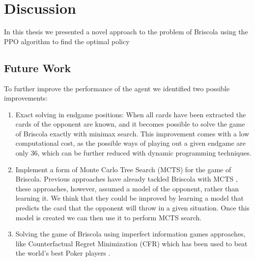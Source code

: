 \chapter{Discussion}
In this thesis we presented a novel approach to the problem of Briscola using the PPO algorithm to find the optimal policy


\section{Future Work}
To further improve the performance of the agent we identified two possible improvements:
\begin{enumerate}
    \item Exact solving in endgame positions: When all cards have been extracted the cards of the opponent are known, and it becomes possible to solve the game of Briscola exactly with minimax search. This improvement comes with a low computational cost, as the possible ways of playing out a given endgame are only 36, which can be further reduced with dynamic programming techniques.
    \item Implement a form of Monte Carlo Tree Search (MCTS) for the game of Briscola. Previous approaches have already tackled Briscola with MCTS \cite{Briscola-mcts-Playing-Algorithm, villa2013-briscola-mcts}, these approaches, however, assumed a model of the opponent, rather than learning it. We think that they could be improved by learning a model that predicts the card that the opponent will throw in a given situation. Once this model is created we can then use it to perform MCTS search.
    \item Solving the game of Briscola using imperfect information games approaches, like Counterfactual Regret Minimization (CFR) which has been used to beat the world's best Poker players \cite{libratus}.
\end{enumerate}
